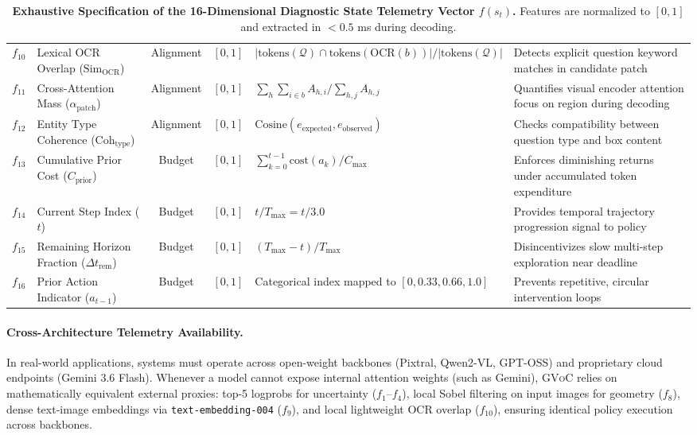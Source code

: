 \documentclass[11pt]{article}
\begin{document}
\begin{table}[t]
{\begin{tabular}{clccll}
$f_{10}$ & Lexical OCR Overlap ($\text{Sim}_{\text{OCR}}$) & Alignment & $[0, 1]$ & $|\text{tokens}(\mathcal{Q}) \cap \text{tokens}(\text{OCR}(b))| / |\text{tokens}(\mathcal{Q})|$ & Detects explicit question keyword matches in candidate patch \\
$f_{11}$ & Cross-Attention Mass ($\alpha_{\text{patch}}$) & Alignment & $[0, 1]$ & $\sum_h \sum_{i \in b} A_{h,i} / \sum_{h,j} A_{h,j}$ & Quantifies visual encoder attention focus on region during decoding \\
$f_{12}$ & Entity Type Coherence ($\text{Coh}_{\text{type}}$) & Alignment & $[0, 1]$ & $\text{Cosine}(e_{\text{expected}}, e_{\text{observed}})$ & Checks compatibility between question type and box content \\
\midrule
$f_{13}$ & Cumulative Prior Cost ($C_{\text{prior}}$) & Budget & $[0, 1]$ & $\sum_{k=0}^{t-1} \text{cost}(a_k) / C_{\max}$ & Enforces diminishing returns under accumulated token expenditure \\
$f_{14}$ & Current Step Index ($t$) & Budget & $[0, 1]$ & $t / T_{\max} = t / 3.0$ & Provides temporal trajectory progression signal to policy \\
$f_{15}$ & Remaining Horizon Fraction ($\Delta t_{\text{rem}}$) & Budget & $[0, 1]$ & $(T_{\max} - t) / T_{\max}$ & Disincentivizes slow multi-step exploration near deadline \\
$f_{16}$ & Prior Action Indicator ($a_{t-1}$) & Budget & $[0, 1]$ & Categorical index mapped to $[0, 0.33, 0.66, 1.0]$ & Prevents repetitive, circular intervention loops \\
\bottomrule
\end{tabular}
}
\vspace{-2mm}
\caption{\textbf{Exhaustive Specification of the 16-Dimensional Diagnostic State Telemetry Vector $f(s_t)$.} Features are normalized to $[0, 1]$ and extracted in $< 0.5$ ms during decoding.}
\label{tab:telemetry_full}
\end{table}

\paragraph{Cross-Architecture Telemetry Availability.}
In real-world applications, systems must operate across open-weight backbones (Pixtral, Qwen2-VL, GPT-OSS) and proprietary cloud endpoints (Gemini 3.6 Flash). Whenever a model cannot expose internal attention weights (such as Gemini), \textsc{GVoC} relies on mathematically equivalent external proxies: top-5 logprobs for uncertainty ($f_1$--$f_4$), local Sobel filtering on input images for geometry ($f_8$), dense text-image embeddings via \texttt{text-embedding-004} ($f_9$), and local lightweight OCR overlap ($f_{10}$), ensuring identical policy execution across backbones.
\end{document}

